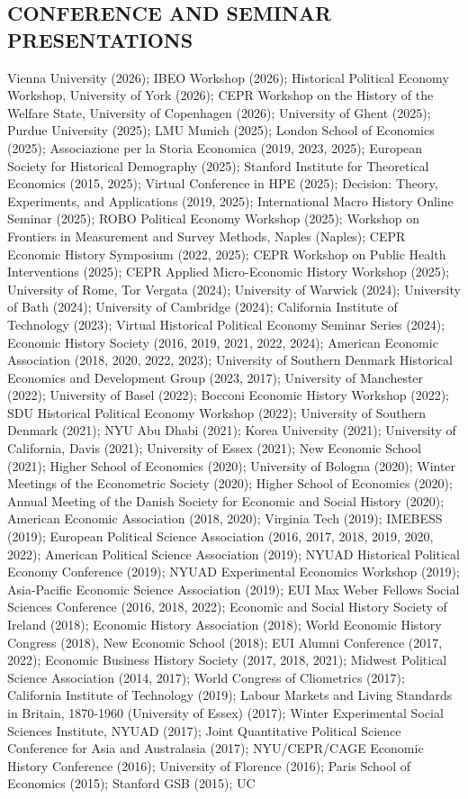 \documentclass{res}  %
\begin{document}
\begin{resume}
\section{CONFERENCE AND SEMINAR PRESENTATIONS}
Vienna University (2026); IBEO Workshop (2026); Historical Political Economy Workshop, University of York (2026); CEPR Workshop on the History of the Welfare State, University of Copenhagen (2026); University of Ghent (2025); Purdue University (2025); LMU Munich (2025); London School of Economics (2025); Associazione per la Storia Economica (2019, 2023, 2025); European Society for Historical Demography (2025); Stanford Institute for Theoretical Economics (2015, 2025); Virtual Conference in HPE (2025); Decision: Theory, Experiments, and Applications (2019, 2025); International Macro History Online Seminar (2025); ROBO Political Economy Workshop (2025); Workshop on Frontiers in Measurement and Survey Methods, Naples (Naples); CEPR Economic History Symposium (2022, 2025); CEPR Workshop on Public Health Interventions (2025); CEPR Applied Micro-Economic History Workshop (2025); University of Rome, Tor Vergata (2024); University of Warwick (2024); University of Bath (2024); University of Cambridge (2024); California Institute of Technology (2023); Virtual Historical Political Economy Seminar Series (2024); Economic History Society (2016, 2019, 2021, 2022, 2024); American Economic Association (2018, 2020, 2022, 2023);  University of Southern Denmark Historical Economics and Development Group (2023, 2017); University of Manchester (2022); University of Basel (2022); Bocconi Economic History Workshop (2022); SDU Historical Political Economy Workshop (2022); University of Southern Denmark (2021); NYU Abu Dhabi (2021); Korea University (2021); University of California, Davis (2021); University of Essex (2021); New Economic School (2021); Higher School of Economics (2020); University of Bologna (2020); Winter Meetings of the Econometric Society (2020); Higher School of Economics (2020); Annual Meeting of the Danish Society for Economic and Social History (2020); American Economic Association (2018, 2020); Virginia Tech (2019); IMEBESS (2019); European Political Science Association (2016, 2017, 2018, 2019, 2020, 2022); American Political Science Association (2019); NYUAD Historical Political Economy Conference (2019); NYUAD Experimental Economics Workshop (2019); Asia-Pacific Economic Science Association (2019); EUI Max Weber Fellows Social Sciences Conference (2016, 2018, 2022); Economic and Social History Society of Ireland (2018); Economic History Association (2018); World Economic History Congress (2018), New Economic School (2018);  EUI Alumni Conference (2017, 2022); Economic Business History Society (2017, 2018, 2021); Midwest Political Science Association (2014, 2017); World Congress of Cliometrics (2017); California Institute of Technology (2019); Labour Markets and Living Standards in Britain, 1870-1960 (University of Essex) (2017);  Winter Experimental Social Sciences Institute, NYUAD (2017); Joint Quantitative Political Science Conference for Asia and Australasia (2017);  NYU/CEPR/CAGE Economic History Conference (2016); University of Florence (2016); Paris School of Economics (2015); Stanford GSB (2015); UC 
\end{resume}
\end{document}
